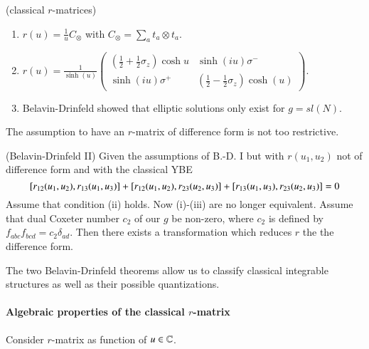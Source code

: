 \begin{example} (classical $r$-matrices)
\begin{enumerate}
	\item $r(u) = \frac{1}{u} C_\otimes$ with $C_\otimes = \sum_a t_a \otimes t_a$.
	\item $r(u) = \frac{1}{\sinh(u)} \begin{pmatrix} (\frac{1}{2} + \frac{1}{2} \sigma_z) \cosh u & \sinh(i u) \sigma^{-} \\ \sinh(i u) \sigma^+ & (\frac{1}{2} - \frac{1}{2} \sigma_z) \cosh(u) \end{pmatrix}$.
	\item Belavin-Drinfeld showed that elliptic solutions only exist for $g = sl(N)$.
\end{enumerate}
\end{example}

The assumption to have an $r$-matrix of difference form is not too restrictive. 

\begin{theorem} (Belavin-Drinfeld II)
	Given the assumptions of B.-D. I but with $r(u_1, u_2)$	 not of difference form and with the classical YBE 
	\begin{equation}
	\comm{r_{12}(u_1, u_2)}{r_{13} (u_1, u_3)} + \comm{r_{12}(u_1, u_2)}{r_{23}(u_2, u_3)} + \comm{r_{13}(u_1, u_3)}{r_{23}(u_2, u_3)} = 0
	\end{equation}
	Assume that condition (ii) holds. Now (i)-(iii) are no longer equivalent. Assume that dual Coxeter number $c_2$ of our $g$ be non-zero, where $c_2$ is defined by $f_{abc} f_{bcd} = c_2 \delta_{ad}$. Then there exists a transformation which reduces $r$ the the difference form.
\end{theorem}

The two Belavin-Drinfeld theorems allow us to classify classical integrable structures as well as their possible quantizations.

\paragraph{Algebraic properties of the classical $r$-matrix}
Consider $r$-matrix as function of $u \in \mathbb{C}$. 

